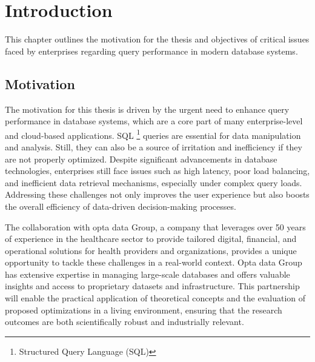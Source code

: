 \section{Introduction}
This chapter outlines the motivation for the thesis and objectives of critical issues faced by enterprises regarding query performance in modern database systems.
\subsection{Motivation}
The motivation for this thesis is driven by the urgent need to enhance query performance in database systems, which are a core part of many enterprise-level and cloud-based applications. SQL \footnote{Structured Query Language (SQL)} queries are essential for data manipulation and analysis. Still, they can also be a source of irritation and inefficiency if they are not properly optimized. Despite significant advancements in database technologies, enterprises still face issues such as high latency, poor load balancing, and inefficient data retrieval mechanisms, especially under complex query loads. Addressing these challenges not only improves the user experience but also boosts the overall efficiency of data-driven decision-making processes.\vspace{.4cm}

The collaboration with opta data Group, a company that leverages over 50 years of experience in the healthcare sector to provide tailored digital, financial, and operational solutions for health providers and organizations, provides a unique opportunity to tackle these challenges in a real-world context. Opta data Group has extensive expertise in managing large-scale databases and offers valuable insights and access to proprietary datasets and infrastructure. This partnership will enable the practical application of theoretical concepts and the evaluation of proposed optimizations in a living environment, ensuring that the research outcomes are both scientifically robust and industrially relevant. \vspace{.3cm}

